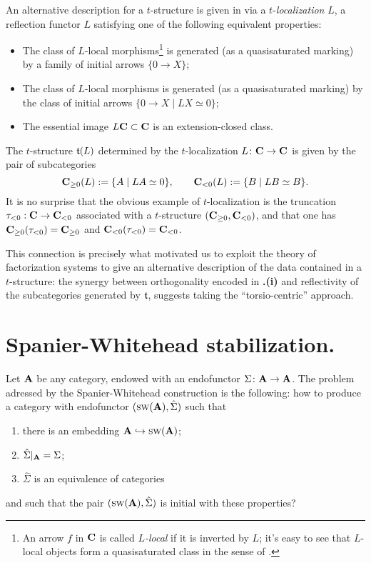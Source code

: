 \begin{remark}
An alternative description for a $t$\hyp{}structure is given in \cite[Prop. \textbf{1.2.1.16}]{LurieHA} via a $t$\hyp{}\emph{localization} $L$, \ie a reflection functor $L$ satisfying one of the following equivalent properties:
\begin{itemize}
\item The class of $L$\hyp{}local morphisms\footnote{An arrow $f$ in $\mathbf{C}$ is called \emph{$L$\hyp{}local} if it is inverted by $L$; it's easy to see that $L$\hyp{}local objects form a quasisaturated class in the sense of \cite[Def. \textbf{1.2.1.14}]{LurieHA}.} is generated (as a quasisaturated marking) by a family of initial arrows $\{0\to X\}$;
\item The class of $L$\hyp{}local morphisms is generated (as a quasisaturated marking) by the class of initial arrows $\{0\to X\mid LX\simeq 0\}$;
\item The essential image $L\mathbf{C}\subset\mathbf{C}$ is an extension\hyp{}closed class.
\end{itemize}
The $t$\hyp{}structure $\mathfrak{t}(L)$ determined by the $t$\hyp{}localization $L\colon \mathbf{C}\to \mathbf{C}$ is given by the pair of subcategories
\[
\mathbf{C}_{\ge 0}(L) := \{A\mid LA\simeq 0\},\qquad \mathbf{C}_{<0}(L) := \{B\mid LB\simeq B\} .
\]
It is no surprise that the obvious example of $t$\hyp{}localization is the truncation $\tau_{<0}:\mathbf{C}\to\mathbf{C}_{<0}$ associated with a $t$\hyp{}structure $(\mathbf{C}_{\geq0},\mathbf{C}_{<0})$, and that one has $\mathbf{C}_{\ge 0}(\tau_{<0})=\mathbf{C}_{\ge 0}$ and $\mathbf{C}_{< 0}(\tau_{<0})=\mathbf{C}_{< 0}$.
\end{remark}
This connection is precisely what motivated us to exploit the theory of factorization systems to give an alternative description of the data contained in a $t$\hyp{}structure: the synergy between orthogonality encoded in \textbf{.(i)} and reflectivity of the subcategories generated by $\mathfrak{t}$, suggests taking the ``torsio\hyp{}centric'' approach.
\section{Spanier\hyp{}Whitehead stabilization.}\label{spanierwhite}
Let $\mathbf{A}$ be any category, endowed with an endofunctor $\Sigma\colon \mathbf{A}\to \mathbf{A}$. The problem adressed by the Spanier\hyp{}Whitehead construction is the following: how to produce a category with endofunctor $(\text{\scshape sw}(\mathbf{A}), \hat \Sigma)$ such that
\begin{enumerate}
\item there is an embedding $\mathbf{A} \hookrightarrow \text{\scshape sw}(\mathbf{A})$;
\item $\hat \Sigma|_{\mathbf{A}} = \Sigma$;
\item $\hat \Sigma$ is an equivalence of categories
\end{enumerate}
and such that the pair $(\text{\scshape sw}(\mathbf{A}), \hat \Sigma)$ is initial with these properties?

